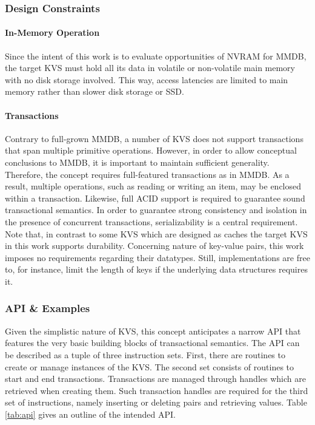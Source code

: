 \subsubsection{Design Constraints}

\paragraph{In-Memory Operation}

Since the intent of this work is to evaluate opportunities of NVRAM for MMDB,
the target KVS must hold all its data in volatile or non-volatile main memory
with no disk storage involved. This way, access latencies are limited to main
memory rather than slower disk storage or SSD.

\paragraph{Transactions}

Contrary to full-grown MMDB, a number of KVS does not support transactions that
span multiple primitive operations. However, in order to allow conceptual
conclusions to MMDB, it is important to maintain sufficient generality.
Therefore, the concept requires full-featured transactions as in MMDB. As a
result, multiple operations, such as reading or writing an item, may be enclosed
within a transaction. Likewise, full ACID support is required to guarantee sound
transactional semantics. In order to guarantee strong consistency and isolation
in the presence of concurrent transactions, serializability is a central
requirement. Note that, in contrast to some KVS which are designed as caches the
target KVS in this work supports durability. Concerning nature of key-value
pairs, this work imposes no requirements regarding their datatypes. Still,
implementations are free to, for instance, limit the length of keys if the
underlying data structures requires it.

\subsubsection{API \& Examples}

Given the simplistic nature of KVS, this concept anticipates a narrow API that
features the very basic building blocks of transactional semantics. The API can
be described as a tuple of three instruction sets. First, there are routines to
create or manage instances of the KVS. The second set consists of routines to
start and end transactions. Transactions are managed through handles which are
retrieved when creating them. Such transaction handles are required for the
third set of instructions, namely inserting or deleting pairs and retrieving
values. Table \ref{tab:api} gives an outline of the intended API.

